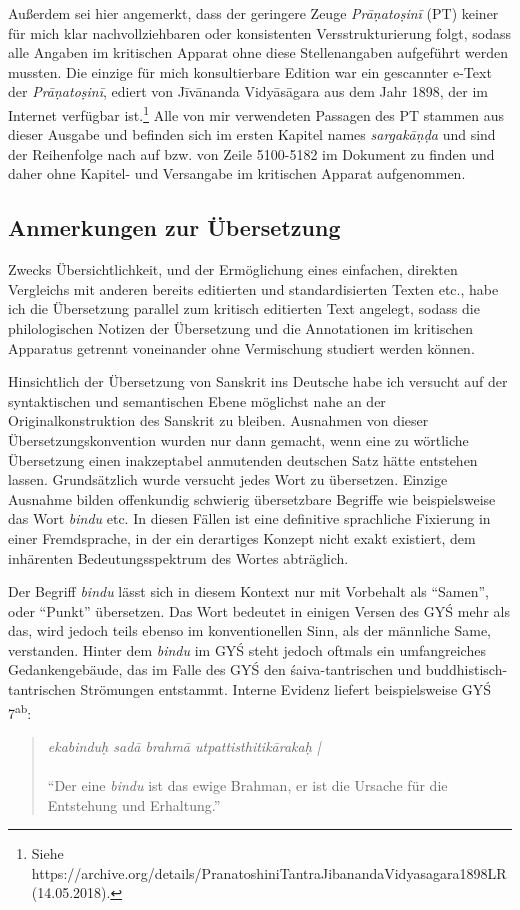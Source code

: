 \documentclass[a4paper,12pt]{article}
\begin{document}
{      Außerdem sei hier angemerkt, dass der geringere Zeuge \textit{Prāṇatoṣinī} (PT) keiner für mich klar nachvollziehbaren oder konsistenten Versstrukturierung folgt, sodass alle Angaben im kritischen Apparat ohne diese Stellenangaben aufgeführt werden mussten. Die einzige für mich konsultierbare Edition war ein gescannter e-Text der \textit{Prāṇatoṣinī}, ediert von Jīvānanda Vidyāsāgara aus dem Jahr 1898, der im Internet verfügbar ist.\footnote{\raggedright{Siehe https://archive.org/details/PranatoshiniTantraJibanandaVidyasagara1898LR (14.05.2018).}} Alle von mir verwendeten Passagen des PT stammen aus dieser Ausgabe und befinden sich im ersten Kapitel names \textit{sargakāṇḍa} und sind der Reihenfolge nach auf \parencite[71-72]{ramatosana} bzw. von Zeile 5100-5182 im Dokument zu finden und daher ohne Kapitel- und Versangabe im kritischen Apparat aufgenommen.  

\subsection{Anmerkungen zur Übersetzung}   

Zwecks Übersichtlichkeit, und der Ermöglichung eines einfachen, direkten Vergleichs mit anderen bereits editierten und standardisierten Texten etc., habe ich die Übersetzung parallel zum kritisch editierten Text angelegt, sodass die philologischen Notizen der Übersetzung und die Annotationen im kritischen Apparatus getrennt voneinander ohne Vermischung studiert werden können. 

Hinsichtlich der Übersetzung von Sanskrit ins Deutsche habe ich versucht auf der syntaktischen und semantischen Ebene möglichst nahe an der Originalkonstruktion des Sanskrit zu bleiben. Ausnahmen von dieser Übersetzungskonvention wurden nur dann gemacht, wenn eine zu wörtliche Übersetzung einen inakzeptabel anmutenden deutschen Satz hätte entstehen lassen. Grundsätzlich wurde versucht jedes Wort zu übersetzen. Einzige Ausnahme bilden offenkundig schwierig übersetzbare Begriffe wie beispielsweise das Wort \textit{bindu} etc. In diesen Fällen ist eine definitive sprachliche Fixierung in einer Fremdsprache, in der ein derartiges Konzept nicht exakt existiert, dem inhärenten Bedeutungsspektrum des Wortes abträglich. 

Der Begriff \textit{bindu} lässt sich in diesem Kontext nur mit Vorbehalt als ``Samen'', oder ``Punkt'' übersetzen. Das Wort bedeutet in einigen Versen des GYŚ mehr als das, wird jedoch teils ebenso im konventionellen Sinn, als der männliche Same, verstanden. Hinter dem \textit{bindu} im GYŚ steht jedoch oftmals ein umfangreiches Gedankengebäude, das im Falle des GYŚ den śaiva-tantrischen und buddhistisch-tantrischen Strömungen entstammt. Interne Evidenz liefert beispielsweise GYŚ 7\textsuperscript{ab}:
\begin{quote}\textit{ekabinduḥ sadā brahmā utpattisthitikārakaḥ |}\\ \\
  ``Der eine \textit{bindu} ist das ewige Brahman, er ist die Ursache für die Entstehung und Erhaltung.''
\end{quote}

}
\end{document}
